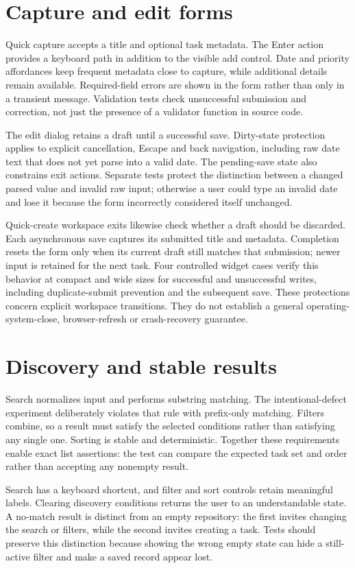 \documentclass[12pt,a4paper,oneside]{report}
\begin{document}
\section{Capture and edit forms}
Quick capture accepts a title and optional task metadata. The Enter action provides a keyboard path in addition to the visible add control. Date and priority affordances keep frequent metadata close to capture, while additional details remain available. Required-field errors are shown in the form rather than only in a transient message. Validation tests check unsuccessful submission and correction, not just the presence of a validator function in source code.

The edit dialog retains a draft until a successful save. Dirty-state protection applies to explicit cancellation, Escape and back navigation, including raw date text that does not yet parse into a valid date. The pending-save state also constrains exit actions. Separate tests protect the distinction between a changed parsed value and invalid raw input; otherwise a user could type an invalid date and lose it because the form incorrectly considered itself unchanged.

Quick-create workspace exits likewise check whether a draft should be discarded. Each asynchronous save captures its submitted title and metadata. Completion resets the form only when its current draft still matches that submission; newer input is retained for the next task. Four controlled widget cases verify this behavior at compact and wide sizes for successful and unsuccessful writes, including duplicate-submit prevention and the subsequent save. These protections concern explicit workspace transitions. They do not establish a general operating-system-close, browser-refresh or crash-recovery guarantee.

\section{Discovery and stable results}
Search normalizes input and performs substring matching. The intentional-defect experiment deliberately violates that rule with prefix-only matching. Filters combine, so a result must satisfy the selected conditions rather than satisfying any single one. Sorting is stable and deterministic. Together these requirements enable exact list assertions: the test can compare the expected task set and order rather than accepting any nonempty result.

Search has a keyboard shortcut, and filter and sort controls retain meaningful labels. Clearing discovery conditions returns the user to an understandable state. A no-match result is distinct from an empty repository: the first invites changing the search or filters, while the second invites creating a task. Tests should preserve this distinction because showing the wrong empty state can hide a still-active filter and make a saved record appear lost.
\end{document}
